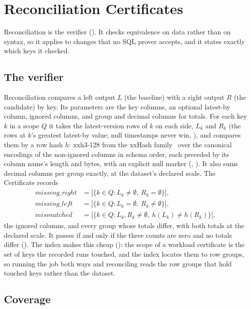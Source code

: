 \section{Reconciliation Certificates}\label{sec:cert}

Reconciliation is the verifier (). It checks equivalence on data
rather than on syntax, so it applies to changes that no SQL prover accepts, and
it states exactly which keys it checked.

\subsection{The verifier}\label{sec:verifier}

Reconciliation compares a left output $L$ (the baseline) with a right output
$R$ (the candidate) by key. Its parameters are the key columns, an optional
latest-by column, ignored columns, and group and decimal columns for totals.
For each key $k$ in a scope $Q$ it takes the latest-version rows of $k$ on each
side, $L_k$ and $R_k$ (the rows at $k$'s greatest latest-by value; null
timestamps never win, ), and compares them by a row hash $h$: xxh3-128
from the xxHash family~\cite{xxhash} over the canonical encodings of the
non-ignored columns in schema order, each preceded by its column name's length
and bytes, with an explicit null marker (, ). It also
sums decimal columns per group exactly, at the dataset's declared scale. The
Certificate records
\begin{align*}
  \mathit{missing\_right} &= |\{ k \in Q : L_k \neq \emptyset,\ R_k = \emptyset \}|,\\
  \mathit{missing\_left}  &= |\{ k \in Q : L_k = \emptyset,\ R_k \neq \emptyset \}|,\\
  \mathit{mismatched}     &= |\{ k \in Q : L_k, R_k \neq \emptyset,\
                              h(L_k) \neq h(R_k) \}|,
\end{align*}
the ignored columns, and every group whose totals differ, with both totals at
the declared scale. It passes if and only if the three counts are zero and no
totals differ (\doc{agent-loop.md}). The index makes this cheap (\adr{004}):
the scope of a workload certificate is the set of keys the recorded runs
touched, and the index locates them to row groups, so running the job both ways
and reconciling reads the row groups that hold touched keys rather than the
dataset.

\subsection{Coverage}\label{sec:coverage}

